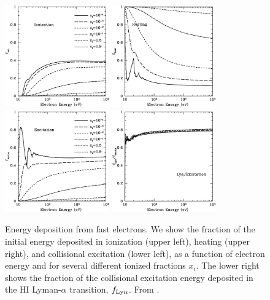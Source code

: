 \begin{figure}[]
\begin{center}
\includegraphics[width=0.4\textwidth]{Furlanetto/figure2-5a} \includegraphics[width=0.4\textwidth]{Furlanetto/figure2-5b} \\
\includegraphics[width=0.4\textwidth]{Furlanetto/figure2-5c} \includegraphics[width=0.4\textwidth]{Furlanetto/figure2-5d}
\end{center}
\caption{Energy deposition from fast electrons. We show the fraction of the initial energy deposited in ionization (upper left), heating (upper right), and collisional excitation (lower left), as a function of electron energy and for several different ionized fractions $x_i$. The lower right shows the fraction of the collisional excitation energy deposited in the HI Lyman-$\alpha$ transition, $f_{\rm Ly\alpha}$.  From \cite{furl10-xray}.}
\label{fig:xrayheat}
\end{figure}

